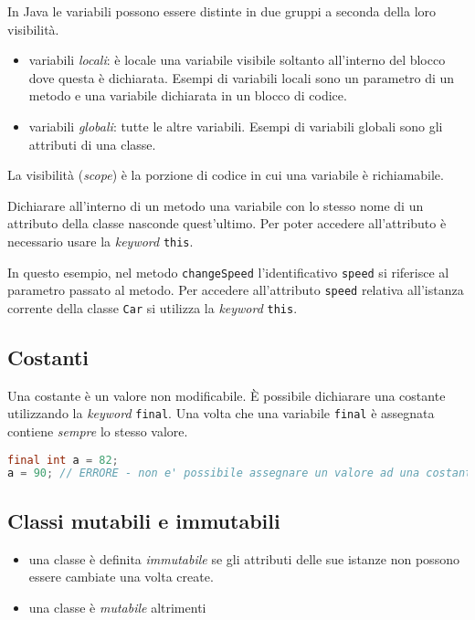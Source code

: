 \documentclass{article}
\begin{document}
In Java le variabili possono essere distinte in due gruppi a seconda della loro visibilità.

\begin{itemize}
\item variabili \emph{locali}: è locale una variabile visibile soltanto all'interno del blocco dove questa è dichiarata.
Esempi di variabili locali sono un parametro di un metodo e una variabile dichiarata in un blocco di codice.
\item variabili \emph{globali}: tutte le altre variabili. Esempi di variabili globali sono gli attributi di una classe.
\end{itemize}

\begin{mydef} La visibilità (\emph{scope}) è la porzione di codice in cui una variabile è richiamabile.
\end{mydef}
Dichiarare all'interno di un metodo una variabile con lo stesso nome di un attributo della classe nasconde quest'ultimo.
Per poter accedere all'attributo è necessario usare la \textit{keyword} \texttt{this}.



In questo esempio, nel metodo \texttt{changeSpeed} l'identificativo \texttt{speed} si riferisce al parametro passato al metodo.
Per accedere all'attributo \texttt{speed} relativa all'istanza corrente della classe \texttt{Car} si utilizza la \textit{keyword} \texttt{this}. 

\subsection{Costanti}
Una costante è un valore non modificabile.
È possibile dichiarare una costante utilizzando la \textit{keyword}
\texttt{final}.  Una volta che una variabile \texttt{final} \`e assegnata contiene \emph{sempre} lo stesso valore.

\begin{lstlisting}[language=Java,escapechar=|]
final int a = 82;
a = 90; // ERRORE - non e' possibile assegnare un valore ad una costante
\end{lstlisting}

\subsection{Classi mutabili e immutabili}
\begin{itemize}
\item una classe è definita \emph{immutabile} se gli attributi delle sue istanze non possono essere cambiate una volta create.
\item una classe è \emph{mutabile} altrimenti
\end{itemize}
\end{document}
